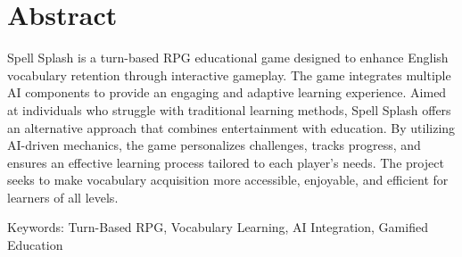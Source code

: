 \chapter*{Abstract}
\label{chap:abstract}

Spell Splash is a turn-based RPG educational game designed to enhance English vocabulary retention through interactive gameplay. 
The game integrates multiple AI components to provide an engaging and adaptive learning experience. Aimed at individuals who struggle with traditional learning methods, 
Spell Splash offers an alternative approach that combines entertainment with education. By utilizing AI-driven mechanics, the game personalizes challenges, tracks progress, 
and ensures an effective learning process tailored to each player’s needs. The project seeks to make vocabulary acquisition more accessible, 
enjoyable, and efficient for learners of all levels.\vspace{1em}

Keywords: Turn-Based RPG, Vocabulary Learning, AI Integration, Gamified Education
